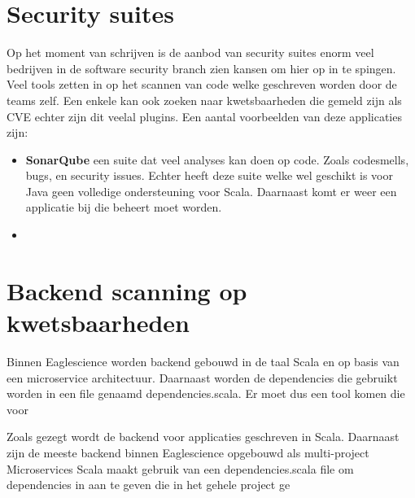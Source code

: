 \section{Security suites}
Op het moment van schrijven is de aanbod van security suites enorm veel bedrijven in de software security branch zien kansen om hier op in te spingen. Veel tools zetten in op het scannen van code welke geschreven worden door de teams zelf. Een enkele kan ook zoeken naar kwetsbaarheden die gemeld zijn als CVE echter zijn dit veelal plugins.
Een aantal voorbeelden van deze applicaties zijn:
\begin{itemize}
    \item \textbf{SonarQube} een suite dat veel analyses kan doen op code. Zoals codesmells, bugs, en security issues. Echter heeft deze suite welke wel geschikt is voor Java geen volledige ondersteuning voor Scala. Daarnaast komt er weer een applicatie bij die beheert moet worden.
    \item \textbf{}
\end{itemize}

\section{Backend scanning op kwetsbaarheden}
Binnen Eaglescience worden backend gebouwd in de taal Scala en op basis van een microservice architectuur. Daarnaast worden de dependencies die gebruikt worden in een file genaamd dependencies.scala. Er moet dus een tool komen die voor

Zoals gezegt wordt de backend voor applicaties geschreven in Scala. Daarnaast zijn de meeste backend binnen Eaglescience opgebouwd als multi-project Microservices Scala maakt gebruik van een dependencies.scala file om dependencies in aan te geven die in het gehele project ge
